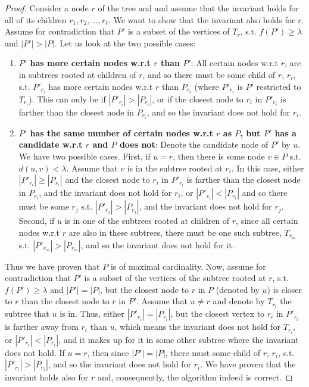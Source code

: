 \documentclass[a4paper,UKenglish]{lipics-v2016}
\theoremstyle{plain}
\begin{document}
\begin{proof}
Consider a node $r$ of the tree and and assume that the invariant holds for all of its children $r_{1},r_{2},\ldots,r_{\ell}$.
We want to show that the invariant also holds for $r$.
Assume for contradiction that $P'$ is a subset of the vertices of $T_r$, s.t. $f(P')\geq\lambda$ and $|P'| > |P|$. Let us look at the two possible cases:
\begin{enumerate}
\item \textbf{\boldmath$P'$ has more certain nodes w.r.t \boldmath$r$ than \boldmath$P'$}: All certain nodes w.r.t $r$, are in subtrees rooted at children of $r$, and so there must be some child of $r$, $r_i$, s.t. $P'_{r_i}$ has more certain nodes w.r.t $r$ than $P_{r_i}$ (where $P'_{r_i}$ is $P'$ restricted to $T_{r_i}$). This can only be if $|P'_{r_i}| > |P_{r_i}|$, or if the closest node to $r_i$ in $P'_{r_i}$ is farther than the closest node in $P_{r_i}$, and so the invariant does not hold for $r_i$.
\item \textbf{\boldmath$P'$ has the same number of certain nodes w.r.t \boldmath$r$ as \boldmath$P$, but \boldmath$P'$ has a candidate w.r.t \boldmath$r$  and \boldmath$P$ does not}: Denote the candidate node of $P'$ by $u$. We have two possible cases. First, if $u=r$, then there is some node $v \in P$ s.t. $d(u,v)<\lambda$. Assume that $v$ is in the subtree rooted at $r_i$. In this case, either $|P'_{r_i}| \geq |P_{r_i}|$ and the closest node to $r_i$ in $P'_{r_i}$ is farther than the closest node in $P_{r_i}$, and the invariant does not hold for $r_i$, or $|P'_{r_i}|<|P_{r_i}|$ and so there must be some $r_j$ s.t. $|P'_{r_j}|>|P_{r_j}|$, and the invariant does not hold for $r_j$. Second, if $u$ is in one of the subtrees rooted at children of $r$, since all certain nodes w.r.t $r$ are also in these subtrees, there must be one such subtree, $T_{r_m}$ s.t. $|P'_{r_m}| > |P_{r_m}|$, and so the invariant does not hold for it.
\end{enumerate} 
Thus we have proven that $P$ is of maximal cardinality. Now, assume for contradiction that $P'$ is a subset of the vertices of the subtree rooted at $r$, s.t. $f(P')\geq\lambda$ and $|P'| = |P|$, but the closest node to $r$ in $P$ (denoted by $u$) is closer to $r$ than the closest node to $r$ in $P'$. Assume that $u \neq r$ and denote by $T_{r_i}$ the subtree that $u$ is in. Thus, either $|P'_{r_i}| = |P_{r_i}|$, but the closest vertex to $r_i$ in $P'_{r_i}$ is farther away from $r_i$ than $u$, which means the invariant does not hold for $T_{r_i}$, or $|P'_{r_i}| < |P_{r_i}|$, and it makes up for it in some other subtree where the invariant does not hold. If $u=r$, then since $|P'| = |P|$, there must some child of $r$, $r_i$, s.t. $|P'_{r_i}| > |P_{r_i}|$, and so the invariant does not hold for $r_i$. We have proven that the invariant holds also for $r$ and, consequently, the algorithm indeed is correct.
\end{proof}
\basicpartitioninglemma*
\end{document}
